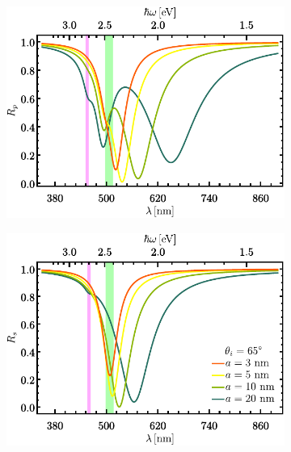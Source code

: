 	\begin{figure}[h!]\centering
	\begin{subfigure}{.01\linewidth}\caption{}\label{sfig:R-RVar-cutp}\vspace{3.75cm}\end{subfigure}\hspace*{-.5em}
	\begin{subfigure}{.45\linewidth}\centering \includegraphics[scale=.75 ]{2-Resultados/figs/3-Wp4rVar/cut_angle_65_p.pdf}\end{subfigure}
	\begin{subfigure}{.01\linewidth}\caption{}\label{sfig:R-RVar-cuts}\vspace{3.75cm}\end{subfigure}\hspace*{-.5em}
	\begin{subfigure}{.45\linewidth}\centering \includegraphics[scale=.75 ]{2-Resultados/figs/3-Wp4rVar/cut_angle_65_s.pdf}\end{subfigure}\vspace*{-.5em}

\end{figure}
